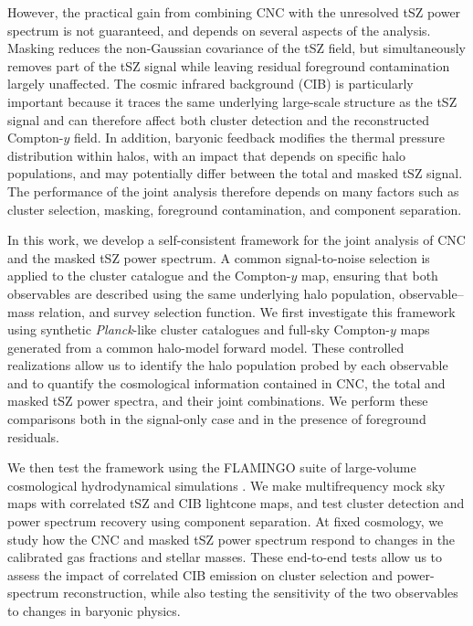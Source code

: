 \documentclass[aps,prd,twocolumn,superscriptaddress,nofootinbib,floatfix]{revtex4-2}
\begin{document}
However, the practical gain from combining CNC with the unresolved tSZ power spectrum is not guaranteed, and depends on several aspects of the analysis. Masking reduces the non-Gaussian covariance of the tSZ field, but simultaneously removes part of the tSZ signal while leaving residual foreground contamination largely unaffected. The cosmic infrared background (CIB) is particularly important because it traces the same underlying large-scale structure as the tSZ signal and can therefore affect both cluster detection and the reconstructed Compton-$y$ field. In addition, baryonic feedback modifies the thermal pressure distribution within halos, with an impact that depends on specific halo populations, and may potentially differ between the total and masked tSZ signal. The performance of the joint analysis therefore depends on many factors such as cluster selection, masking, foreground contamination, and component separation.

In this work, we develop a self-consistent framework for the joint analysis of CNC and the masked tSZ power spectrum. A common signal-to-noise selection is applied to the cluster catalogue and the Compton-$y$ map, ensuring that both observables are described using the same underlying halo population, observable--mass relation, and survey selection function. We first investigate this framework using synthetic \textit{Planck}-like cluster catalogues and full-sky Compton-$y$ maps generated from a common halo-model forward model. These controlled realizations allow us to identify the halo population probed by each observable and to quantify the cosmological information contained in CNC, the total and masked tSZ power spectra, and their joint combinations. We perform these comparisons both in the signal-only case and in the presence of foreground residuals.

We then test the framework using the FLAMINGO suite of large-volume cosmological hydrodynamical simulations \citep{Schaye2023}. We make multifrequency mock sky maps with correlated tSZ and CIB lightcone maps, and test cluster detection and power spectrum recovery using component separation. At fixed cosmology, we study how the CNC and masked tSZ power spectrum respond to changes in the calibrated gas fractions and stellar masses. These end-to-end tests allow us to assess the impact of correlated CIB emission on cluster selection and power-spectrum reconstruction, while also testing the sensitivity of the two observables to changes in baryonic physics.

\end{document}
